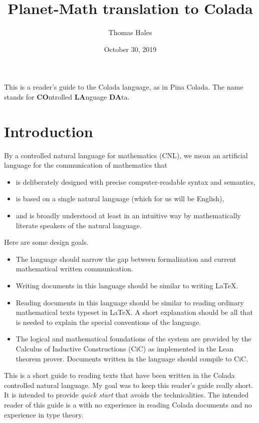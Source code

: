 \documentclass[12pt]{article}
\title{Planet-Math translation to Colada}
\date{October 30, 2019}
\author{Thomas Hales}
\numberwithin{definition}{section}
\begin{document}
\maketitle

\setcounter{tocdepth}{1}
\tableofcontents
\newpage

\newcommand{\Nat}{{\mathbb N}}
\newcommand{\Int}{{\mathbb Z}}
\newcommand{\Real}{{\mathbb R}}

This is a reader's guide to the Colada language, as in Pina Colada.  The name
stands for {\bf CO}ntrolled {\bf LA}nguage {\bf DA}ta.

\section{Introduction}


By a controlled natural language for mathematics (CNL), we mean an
artificial language for the communication of mathematics that
\begin{itemize}
\item is deliberately designed with precise computer-readable syntax
  and semantics,
\item is based on a single natural language (which for us will be
  English),
\item and is broadly understood at least in an intuitive way by
  mathematically literate speakers of the natural language.
\end{itemize}




Here are some design goals.
\begin{itemize}
\item The language should narrow the gap between formalization and
  current mathematical written communication.
\item Writing documents in this language should be similar to writing
  \LaTeX.
\item Reading documents in this language should be similar to reading
  ordinary mathematical texts typeset in \LaTeX.  A short explanation
  should be all that is needed to explain the special conventions of
  the language.
\item The logical and mathematical foundations of the system are
  provided by the Calculus of Inductive Constructions (CiC) as
  implemented in the Lean theorem prover.  Documents written in the
  language should compile to CiC.
\end{itemize}


This is a short guide to reading texts that have been written in the
Colada controlled natural language.  My goal was to keep this reader's
guide really short.  It is intended to provide \emph{quick start} that
avoids the technicalities.  The intended reader of this guide is a
with no experience in reading Colada documents and no experience in type theory.
\end{document}
